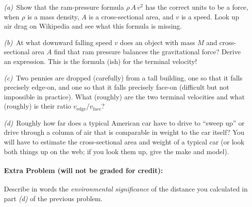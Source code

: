 \documentclass[12pt]{article}
\begin{document}
\textsl{(a)}~Show that the ram-pressure formula $\rho\,A\,v^2$ has the
correct units to be a force, when $\rho$ is a mass density, $A$ is a
cross-sectional area, and $v$ is a speed. Look up air drag on
Wikipedia and see what this formula is missing.

\textsl{(b)}~At what downward falling speed $v$ does an object with
mass $M$ and cross-sectional area $A$ find that ram pressure balances
the gravitational force? Derive an expression. This is the formula
(ish) for the terminal velocity!

\textsl{(c)}~Two pennies are dropped (carefully) from a tall building,
one so that it falls precisely edge-on, and one so that it falls
precisely face-on (difficult but not impossible in practice).  What
(roughly) are the two terminal velocities and what (roughly) is
their ratio $v_{\mathrm{edge}}/v_{\mathrm{face}}$?

\textsl{(d)}~Roughly how far does a typical American car have to drive
to ``sweep up'' or drive through a column of air that is comparable in
weight to the car itself?  You will have to estimate the
cross-sectional area and weight of a typical car (or look both things
up on the web; if you look them up, give the make and model).

\paragraph{Extra Problem (will not be graded for credit):}%
Describe in words the \emph{environmental significance} of the
distance you calculated in part \textsl{(d)} of the previous problem.
\end{document}
